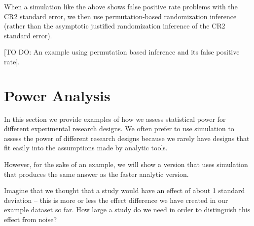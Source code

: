 \documentclass[
  12pt,
]{book}
\theoremstyle{definition}
\theoremstyle{definition}
\theoremstyle{definition}
\theoremstyle{remark}
\begin{document}
When a simulation like the above shows false positive rate problems with
the CR2 standard error, we then use permutation-based randomization
inference (rather than the asymptotic justified randomization inference
of the CR2 standard error).

{[}TO DO: An example using permutation based inference and its false
positive rate{]}.

\hypertarget{poweranalysis}{%
\chapter{Power Analysis}\label{poweranalysis}}

In this section we provide examples of how we assess statistical power
for different experimental research designs. We often prefer to use
simulation to assess the power of different research designs because we
rarely have designs that fit easily into the assumptions made by
analytic tools.

However, for the sake of an example, we will show a version that uses
simulation that produces the same answer as the faster analytic version.

Imagine that we thought that a study would have an effect of about 1
standard deviation -- this is more or less the effect difference we have
created in our example dataset so far. How large a study do we need in
order to distinguish this effect from noise?
\end{document}
